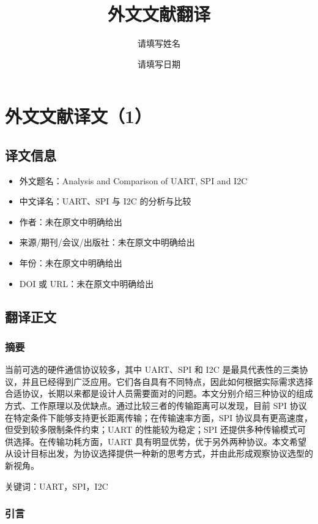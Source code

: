 \documentclass[12pt,a4paper]{article}
\title{外文文献翻译}
\author{请填写姓名}
\date{请填写日期}
\numberwithin{equation}{section}
\begin{document}

\tableofcontents
\clearpage
{}
\setcounter{page}{1}


\section{外文文献译文（1）}
\subsection{译文信息}
\begin{itemize}
\item 外文题名：Analysis and Comparison of UART, SPI and I2C
\item 中文译名：UART、SPI 与 I2C 的分析与比较
\item 作者：未在原文中明确给出
\item 来源/期刊/会议/出版社：未在原文中明确给出
\item 年份：未在原文中明确给出
\item DOI 或 URL：未在原文中明确给出
\end{itemize}

\subsection{翻译正文}
\subsubsection*{摘要}

当前可选的硬件通信协议较多，其中 UART、SPI 和 I2C 是最具代表性的三类协议，并且已经得到广泛应用。它们各自具有不同特点，因此如何根据实际需求选择合适协议，长期以来都是设计人员需要面对的问题。本文分别介绍三种协议的组成方式、工作原理以及优缺点。通过比较三者的传输距离可以发现，目前 SPI 协议在特定条件下能够支持更长距离传输；在传输速率方面，SPI 协议具有更高速度，但受到较多限制条件约束；UART 的性能较为稳定；SPI 还提供多种传输模式可供选择。在传输功耗方面，UART 具有明显优势，优于另外两种协议。本文希望从设计目标出发，为协议选择提供一种新的思考方式，并由此形成观察协议选型的新视角。

关键词：UART，SPI，I2C

\subsubsection*{引言}
\end{document}
